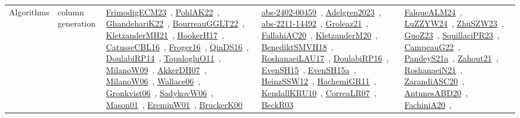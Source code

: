 {\begin{longtable}{lp{3cm}>{\raggedright\arraybackslash}p{6cm}>{\raggedright\arraybackslash}p{6cm}>{\raggedright\arraybackslash}p{8cm}}
\index{column generation}\index{Algorithms!column generation}Algorithms & column generation & \href{../works/FrimodigECM23.pdf}{FrimodigECM23}~\cite{FrimodigECM23}, \href{../works/PohlAK22.pdf}{PohlAK22}~\cite{PohlAK22}, \href{../works/GhandehariK22.pdf}{GhandehariK22}~\cite{GhandehariK22}, \href{../works/BourreauGGLT22.pdf}{BourreauGGLT22}~\cite{BourreauGGLT22}, \href{../works/KletzanderMH21.pdf}{KletzanderMH21}~\cite{KletzanderMH21}, \href{../works/HookerH17.pdf}{HookerH17}~\cite{HookerH17}, \href{../works/CatusseCBL16.pdf}{CatusseCBL16}~\cite{CatusseCBL16}, \href{../works/Froger16.pdf}{Froger16}~\cite{Froger16}, \href{../works/QinDS16.pdf}{QinDS16}~\cite{QinDS16}, \href{../works/DoulabiRP14.pdf}{DoulabiRP14}~\cite{DoulabiRP14}, \href{../works/TopalogluO11.pdf}{TopalogluO11}~\cite{TopalogluO11}, \href{../works/MilanoW09.pdf}{MilanoW09}~\cite{MilanoW09}, \href{../works/AkkerDH07.pdf}{AkkerDH07}~\cite{AkkerDH07}, \href{../works/MilanoW06.pdf}{MilanoW06}~\cite{MilanoW06}, \href{../works/Wallace06.pdf}{Wallace06}~\cite{Wallace06}, \href{../works/Gronkvist06.pdf}{Gronkvist06}~\cite{Gronkvist06}, \href{../works/SadykovW06.pdf}{SadykovW06}~\cite{SadykovW06}, \href{../works/Mason01.pdf}{Mason01}~\cite{Mason01}, \href{../works/EreminW01.pdf}{EreminW01}~\cite{EreminW01}, \href{../works/BruckerK00.pdf}{BruckerK00}~\cite{BruckerK00} & \href{../works/abs-2402-00459.pdf}{abs-2402-00459}~\cite{abs-2402-00459}, \href{../works/Adelgren2023.pdf}{Adelgren2023}~\cite{Adelgren2023}, \href{../works/abs-2211-14492.pdf}{abs-2211-14492}~\cite{abs-2211-14492}, \href{../works/Groleaz21.pdf}{Groleaz21}~\cite{Groleaz21}, \href{../works/FallahiAC20.pdf}{FallahiAC20}~\cite{FallahiAC20}, \href{../works/KletzanderM20.pdf}{KletzanderM20}~\cite{KletzanderM20}, \href{../works/BenediktSMVH18.pdf}{BenediktSMVH18}~\cite{BenediktSMVH18}, \href{../works/RoshanaeiLAU17.pdf}{RoshanaeiLAU17}~\cite{RoshanaeiLAU17}, \href{../works/DoulabiRP16.pdf}{DoulabiRP16}~\cite{DoulabiRP16}, \href{../works/EvenSH15.pdf}{EvenSH15}~\cite{EvenSH15}, \href{../works/EvenSH15a.pdf}{EvenSH15a}~\cite{EvenSH15a}, \href{../works/HeinzSSW12.pdf}{HeinzSSW12}~\cite{HeinzSSW12}, \href{../works/HachemiGR11.pdf}{HachemiGR11}~\cite{HachemiGR11}, \href{../works/KendallKRU10.pdf}{KendallKRU10}~\cite{KendallKRU10}, \href{../works/CorreaLR07.pdf}{CorreaLR07}~\cite{CorreaLR07}, \href{../works/BeckR03.pdf}{BeckR03}~\cite{BeckR03} & \href{../works/FalqueALM24.pdf}{FalqueALM24}~\cite{FalqueALM24}, \href{../works/LuZZYW24.pdf}{LuZZYW24}~\cite{LuZZYW24}, \href{../works/ZhuSZW23.pdf}{ZhuSZW23}~\cite{ZhuSZW23}, \href{../works/GuoZ23.pdf}{GuoZ23}~\cite{GuoZ23}, \href{../works/SquillaciPR23.pdf}{SquillaciPR23}~\cite{SquillaciPR23}, \href{../works/CampeauG22.pdf}{CampeauG22}~\cite{CampeauG22}, \href{../works/PandeyS21a.pdf}{PandeyS21a}~\cite{PandeyS21a}, \href{../works/Zahout21.pdf}{Zahout21}~\cite{Zahout21}, \href{../works/RoshanaeiN21.pdf}{RoshanaeiN21}~\cite{RoshanaeiN21}, \href{../works/ZarandiASC20.pdf}{ZarandiASC20}~\cite{ZarandiASC20}, \href{../works/AntunesABD20.pdf}{AntunesABD20}~\cite{AntunesABD20}, \href{../works/FachiniA20.pdf}{FachiniA20}~\cite{FachiniA20}, 
\end{longtable}}
